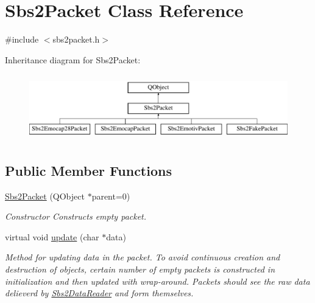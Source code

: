 \hypertarget{classSbs2Packet}{\section{Sbs2\-Packet Class Reference}
\label{classSbs2Packet}
}


{\ttfamily \#include $<$sbs2packet.\-h$>$}

Inheritance diagram for Sbs2\-Packet\-:\begin{figure}[H]
\begin{center}
\leavevmode
\includegraphics[height=2.896552cm]{classSbs2Packet}
\end{center}
\end{figure}
\subsection*{Public Member Functions}
\begin{DoxyCompactItemize}
\item 
\hyperlink{classSbs2Packet_a092be5f534662370b7d20f78abee1adb}{Sbs2\-Packet} (Q\-Object $\ast$parent=0)
\begin{DoxyCompactList}\small\item\em Constructor Constructs empty packet. \end{DoxyCompactList}\item 
virtual void \hyperlink{classSbs2Packet_a8b80c76000ceead51e9278c833bb56ae}{update} (char $\ast$data)
\begin{DoxyCompactList}\small\item\em Method for updating data in the packet. To avoid continuous creation and destruction of objects, certain number of empty packets is constructed in initialization and then updated with wrap-\/around. Packets should see the raw data delieverd by \hyperlink{classSbs2DataReader}{Sbs2\-Data\-Reader} and form themselves. \end{DoxyCompactList}\end{DoxyCompactItemize}
